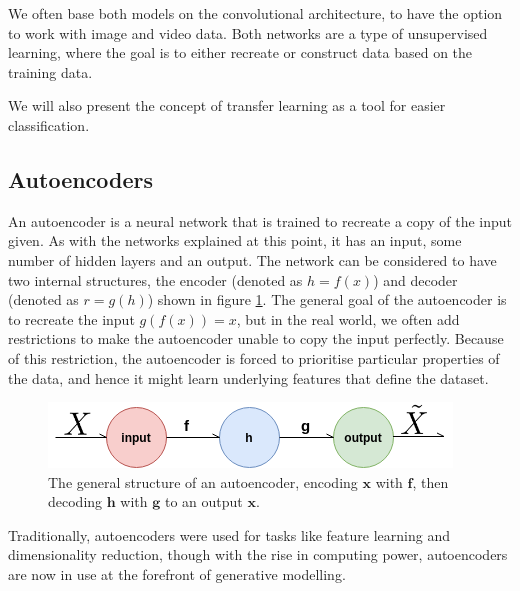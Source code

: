 We often base both models on the convolutional architecture, to have the option to work with image and video data. 
Both networks are a type of unsupervised learning, where the goal is to either recreate or construct data based on the training data.

We will also present the concept of transfer learning as a tool for easier classification.


\subsection{Autoencoders}
\label{cha:Explaining_autoencoders}
An autoencoder is a neural network that is trained to recreate a copy of the input given. 
As with the networks explained at this point, it has an input, some number of hidden layers and an output. The network can be considered to have two internal structures, the encoder (denoted as $h=f(x)$) and decoder (denoted as $r=g(h)$) shown in figure \ref{fig:simpleAE}.
The general goal of the autoencoder is to recreate the input $g(f(x)) = x$, but in the real world, we often add restrictions to make the autoencoder unable to copy the input perfectly. Because of this restriction, the autoencoder is forced to prioritise particular properties of the data, and hence it might learn underlying features that define the dataset.

\begin{figure}[t]
    \centering
    \includegraphics[scale=0.8]{background/figures/SimpleAE.png}
    \caption{The general structure of an autoencoder, encoding $\textbf{x}$ with $\textbf{f}$, then decoding $\textbf{h}$ with $\textbf{g}$ to an output $\textbf{x}$.}
    \label{fig:simpleAE}
\end{figure}

Traditionally, autoencoders were used for tasks like feature learning and dimensionality reduction, though with the rise in computing power, autoencoders are now in use at the forefront of generative modelling.

